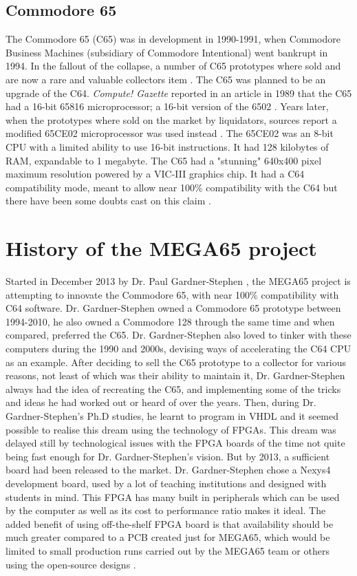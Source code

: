 \subsection{Commodore 65}
The Commodore 65 (C65) was in development in 1990-1991, when Commodore Business Machines (subsidiary of Commodore Intentional) went bankrupt in 1994. In the fallout of the collapse, a number of C65 prototypes where sold and are now a rare and valuable collectors item \cite{RN132}. The C65 was planned to be an upgrade of the C64. \textit{Compute! Gazette} reported in an article in 1989 that the C65 had a 16-bit 65816 microprocessor; a 16-bit version of the 6502 
\cite{RN31}. Years later, when the prototypes where sold on the market by liquidators, sources report a modified 65CE02 microprocessor was used instead
\cite{RN30}
\cite{RN78}. The 65CE02 was an 8-bit CPU with a limited ability to use 16-bit instructions. It had 128 kilobytes of RAM, expandable to 1 megabyte. The C65 had a "stunning" 640x400 pixel maximum resolution 
\cite{RN31} powered by a VIC-III graphics chip. It had a C64 compatibility mode, meant to allow near 100\% compatibility with the C64 but there have been some doubts cast on this claim
\cite{RN30}. 

\section{History of the MEGA65 project}
\label{History of the MEGA65 project}
Started in December 2013 by Dr. Paul Gardner-Stephen 
\cite{RN44}, the MEGA65 project is attempting to innovate the Commodore 65, with near 100\% compatibility with C64 software. Dr. Gardner-Stephen owned a Commodore 65 prototype between 1994-2010, he also owned a Commodore 128 through the same time and when compared, preferred the C65. Dr. Gardner-Stephen also loved to tinker with these computers during the 1990 and 2000s, devising ways of accelerating the C64 CPU as an example. After deciding to sell the C65 prototype to a collector for various reasons, not least of which was their ability to maintain it, Dr. Gardner-Stephen always had the idea of recreating the C65, and implementing some of the tricks and ideas he had worked out or heard of over the years. Then, during Dr. Gardner-Stephen's Ph.D studies, he learnt to program in VHDL and it seemed possible to realise this dream using the technology of FPGAs. This dream was delayed still by technological issues with the FPGA boards of the time not quite being fast enough for Dr. Gardner-Stephen's vision. But by 2013, a sufficient board had been released to the market. Dr. Gardner-Stephen chose a Nexys4 development board, used by a lot of teaching institutions and designed with students in mind. This FPGA has many built in peripherals which can be used by the computer as well as its cost to performance ratio makes it ideal. The added benefit of using off-the-shelf FPGA board is that availability should be much greater compared to a PCB created just for MEGA65, which would be limited to small production runs carried out by the MEGA65 team or others using the open-source designs 
\cite{RN45}.

